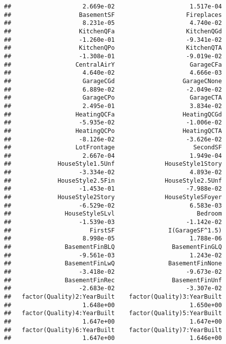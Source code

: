 \documentclass[
]{article}
\begin{document}
\begin{verbatim}
##                    2.669e-02                     1.517e-04  
##                   BasementSF                    Fireplaces  
##                    8.231e-05                     4.740e-02  
##                   KitchenQFa                    KitchenQGd  
##                   -1.260e-01                    -9.341e-02  
##                   KitchenQPo                    KitchenQTA  
##                   -1.308e-01                    -9.019e-02  
##                  CentralAirY                     GarageCFa  
##                    4.640e-02                     4.666e-03  
##                    GarageCGd                   GarageCNone  
##                    6.889e-02                    -2.049e-02  
##                    GarageCPo                     GarageCTA  
##                    2.495e-01                     3.834e-02  
##                  HeatingQCFa                   HeatingQCGd  
##                   -5.935e-02                    -1.006e-02  
##                  HeatingQCPo                   HeatingQCTA  
##                   -8.126e-02                    -3.626e-02  
##                  LotFrontage                      SecondSF  
##                    2.667e-04                     1.949e-04  
##             HouseStyle1.5Unf              HouseStyle1Story  
##                   -3.334e-02                     4.893e-02  
##             HouseStyle2.5Fin              HouseStyle2.5Unf  
##                   -1.453e-01                    -7.988e-02  
##             HouseStyle2Story              HouseStyleSFoyer  
##                   -6.529e-02                     6.583e-03  
##               HouseStyleSLvl                       Bedroom  
##                   -1.539e-03                    -1.142e-02  
##                      FirstSF               I(GarageSF^1.5)  
##                    8.998e-05                     1.788e-06  
##               BasementFinBLQ                BasementFinGLQ  
##                   -9.561e-03                     1.243e-02  
##               BasementFinLwQ               BasementFinNone  
##                   -3.418e-02                    -9.673e-02  
##               BasementFinRec                BasementFinUnf  
##                   -2.683e-02                    -3.307e-02  
##   factor(Quality)2:YearBuilt    factor(Quality)3:YearBuilt  
##                    1.648e+00                     1.650e+00  
##   factor(Quality)4:YearBuilt    factor(Quality)5:YearBuilt  
##                    1.647e+00                     1.647e+00  
##   factor(Quality)6:YearBuilt    factor(Quality)7:YearBuilt  
##                    1.647e+00                     1.646e+00  

\end{verbatim}
\end{document}
